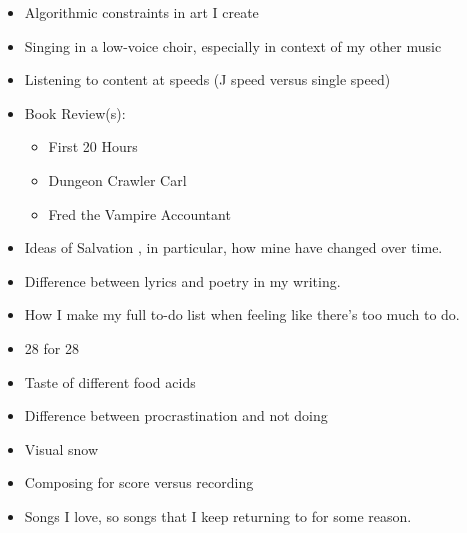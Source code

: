 \begin{itemize}
I wrote two drafts of it, one focused on the feeling of losing my mom and one on the idea of letting go of the attachments I have that don't serve me.  
Both are from July 2026.
	\item Algorithmic constraints in art I create%
	\item Singing in a low-voice choir, especially in context of my other music
	\item Listening to content at speeds (J speed versus single speed)%
	\item Book Review(s):
	\begin{itemize}
		\item First 20 Hours
		\item Dungeon Crawler Carl
		\item Fred the Vampire Accountant
	\end{itemize}
	\item Ideas of Salvation%
	, in particular, how mine have changed over time.
	\item Difference between lyrics and poetry in my writing.%
	\item How I make my full to-do list when feeling like there's too much to do.%
	\item 28 for 28
	\item Taste of different food acids%
	\item Difference between procrastination and not doing
	\item Visual snow %
	\item Composing for score versus recording %
	\item Songs I love, so songs that I keep returning to for some reason. %
\end{itemize}
